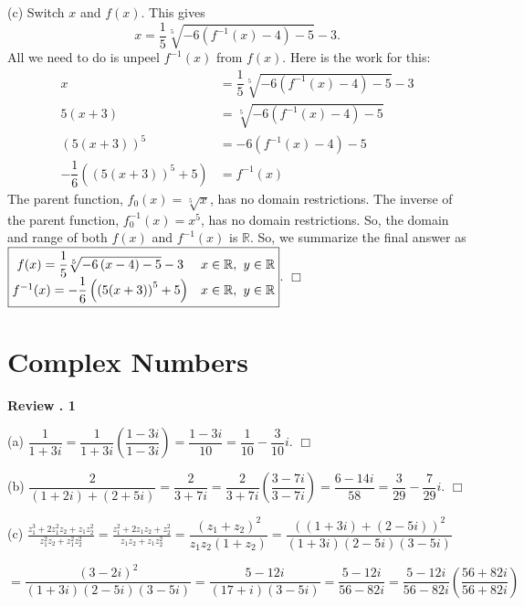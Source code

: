 \documentclass[lang=en,11pt]{elegantbook}
\begin{document}
(c) Switch $x$ and $f(x)$.  This gives $$x=\dfrac{1}{5}\sqrt[5]{-6\left(f^{-1}(x)-4\right)-5}-3.$$  All we need to do is unpeel $f^{-1}(x)$ from $f(x)$.  Here is the work for this: \begin{align*}
    x&=\dfrac{1}{5}\sqrt[5]{-6\left(f^{-1}(x)-4\right)-5}-3 \\
    5(x+3)&=\sqrt[5]{-6\left(f^{-1}(x)-4\right)-5} \\
    \left(5(x+3)\right)^5&=-6\left(f^{-1}(x)-4\right)-5 \\
    -\dfrac{1}{6}\left(\left(5(x+3)\right)^5+5\right)&=f^{-1}(x)
\end{align*}
The parent function, $f_0(x)=\sqrt[5]{x}$, has no domain restrictions.  The inverse of the parent function, $f_0^{-1}(x)=x^5$, has no domain restrictions.  So, the domain and range of both $f(x)$ and $f^{-1}(x)$ is $\mathbb{R}$.  So, we summarize the final answer as $\boxed{\begin{matrix} f(x)=\dfrac{1}{5}\sqrt[5]{-6\left(x-4\right)-5}-3 & x\in\mathbb{R}, \hspace{0.05in} y\in\mathbb{R} \\ f^{-1}(x)=-\dfrac{1}{6}\left(\left(5(x+3)\right)^5+5\right) & x\in\mathbb{R}, \hspace{0.05in} y\in\mathbb{R} \end{matrix}}$. $\Box$

\chapter{Complex Numbers}

\noindent \textbf{Review . 1}

(a) $\displaystyle \dfrac{1}{1+3i}=\dfrac{1}{1+3i}\left(\dfrac{1-3i}{1-3i}\right)=\dfrac{1-3i}{10}=\boxed{\dfrac{1}{10}-\dfrac{3}{10}i}.$ $\Box$

(b) $\displaystyle \dfrac{2}{\left(1+2i\right)+\left(2+5i\right)}=\dfrac{2}{3+7i}=\dfrac{2}{3+7i}\left(\dfrac{3-7i}{3-7i}\right)=\dfrac{6-14i}{58}=\boxed{\dfrac{3}{29}-\dfrac{7}{29}i}.$ $\Box$

(c) $\displaystyle \frac{z_1^3+2z_1^2z_2+z_1z_2^2}{z_1^2z_2+z_1^2z_2^2}=\frac{z_1^2+2z_1z_2+z_2^2}{z_1z_2+z_1z_2^2}=\dfrac{(z_1+z_2)^2}{z_1z_2(1+z_2)}=\dfrac{\left((1+3i)+(2-5i)\right)^2}{(1+3i)(2-5i)(3-5i)}$

\hspace{5mm} $\displaystyle =\dfrac{(3-2i)^2}{(1+3i)(2-5i)(3-5i)}=\dfrac{5-12i}{(17+i)(3-5i)}=\dfrac{5-12i}{56-82i}=\dfrac{5-12i}{56-82i}\left(\dfrac{56+82i}{56+82i}\right)$
\end{document}
